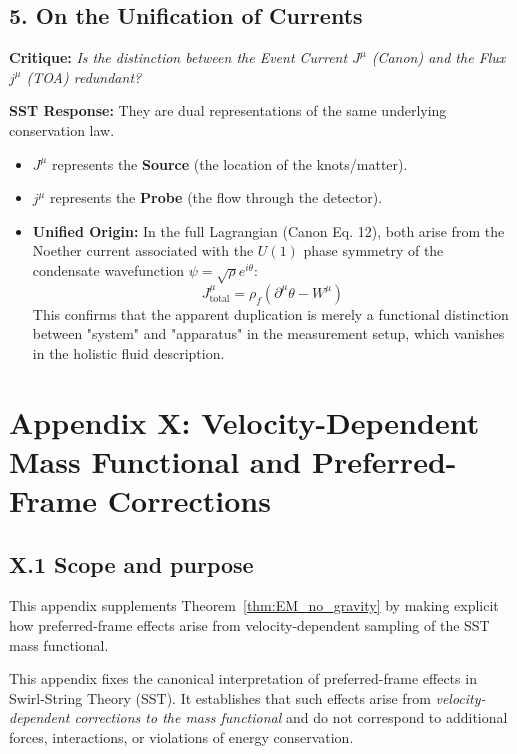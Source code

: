 \documentclass[10pt]{article}
\begin{document}
\subsection*{5. On the Unification of Currents}
\noindent \textbf{Critique:} \textit{Is the distinction between the Event Current $J^\mu$ (Canon) and the Flux $j^\mu$ (TOA) redundant?}

\noindent \textbf{SST Response:}
They are dual representations of the same underlying conservation law.
\begin{itemize}
    \item $J^\mu$ represents the \textbf{Source} (the location of the knots/matter).
    \item $j^\mu$ represents the \textbf{Probe} (the flow through the detector).
    \item \textbf{Unified Origin:} In the full Lagrangian (Canon Eq. 12), both arise from the Noether current associated with the $U(1)$ phase symmetry of the condensate wavefunction $\psi = \sqrt{\rho} e^{i\theta}$:
    \begin{equation}
        J_{\text{total}}^\mu = \rho_f (\partial^\mu \theta - W^\mu)
    \end{equation}
    This confirms that the apparent duplication is merely a functional distinction between "system" and "apparatus" in the measurement setup, which vanishes in the holistic fluid description.
\end{itemize}

    \section*{Appendix X: Velocity-Dependent Mass Functional and Preferred-Frame Corrections}

    \subsection*{X.1 Scope and purpose}

        This appendix supplements Theorem~\ref{thm:EM_no_gravity} by making explicit
        how preferred-frame effects arise from velocity-dependent sampling of the
        SST mass functional.

        This appendix fixes the canonical interpretation of preferred-frame effects in
        Swirl-String Theory (SST). It establishes that such effects arise from
        \emph{velocity-dependent corrections to the mass functional} and do not correspond
        to additional forces, interactions, or violations of energy conservation.
\end{document}
